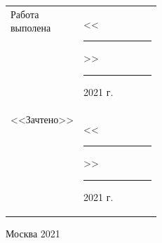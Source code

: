 \begin{flushleft}
	\begin{tabular}{p{0.25\linewidth}l}

		Работа выполена & <<\noindent\rule{2em}{1pt}>>
		                    \noindent\rule{5em}{1pt} 2021 г. \\

		<<Зачтено>> & <<\noindent\rule{2em}{1pt}>>
		                    \noindent\rule{5em}{1pt} 2021 г. \\

	\end{tabular}
\end{flushleft}

\normalsize
\begin{center}	
\vfill 
Москва 2021
\end{center}
